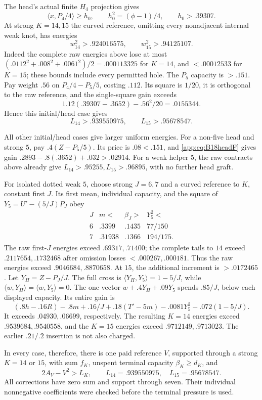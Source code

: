 \documentclass[11pt]{article}
\theoremstyle{definition}
\theoremstyle{remark}
\newcommand{\ip}[2]{\langle #1,#2\rangle}
\begin{document}
The head's actual finite \(H_4\) projection gives
\[
 \ip x{P_4/4}\geq h_0,\qquad
 h_0^2=(\phi-1)/4,\qquad h_0>.39307.
\]
At strong \(K=14,15\) the curved reference, omitting every
nonadjacent internal weak knot, has energies
\[
 w_{14}^2>.924016575,\qquad w_{15}^2>.94125107.
\]
Indeed the complete raw energies above lose at most
\((.0112^2+.008^2+.0061^2)/2=.000113325\)
for \(K=14\), and \(<.00012533\) for \(K=15\);
these bounds include every permitted hole.
The \(P_5\) capacity is \(>.151\).
Pay weight \(.56\) on \(P_4/4-P_5/5\), costing \(.112\).
Its square is \(1/20\), it is orthogonal to the raw reference,
and the single-square gain exceeds
\[
 1.12(.39307-.3652)-.56^2/20=.0155344.
\]
Hence this initial/head case gives
\[
 L_{14}>.939550975,\qquad L_{15}>.95678547.
\]

All other initial/head cases give larger uniform energies.
For a non-five head and strong \(5\), pay \(.4(Z-P_5/5)\).
Its price is \(.08<.151\), and
\eqref{app:eq:B18headF} gives gain
\(.2893-.8(.3652)+.032>.02914\).
For a weak helper \(5\), the raw contracts above already
give \(L_{14}>.95255,L_{15}>.96895\), with no further head graft.

For isolated dotted weak \(5\), choose strong \(J=6,7\) and
a curved reference to \(K\), constant first \(J\).
Its first mean, individual capacity, and the square of
\(Y_5=U'-(5/J)P_J\) obey
\[
\begin{array}{c|ccc}
J&m<&\beta_J>&Y_5^2<\\ \hline
6&.3399&.1435&77/150\\
7&.31938&.1366&194/175 .
\end{array}
\]
The raw first-\(J\) energies exceed \(.69317,.71400\);
the complete tails to \(14\) exceed \(.2117654,.1732468\)
after omission losses \(<.000267,.000181\).
Thus the raw energies exceed \(.9046684,.8870658\).
At \(15\), the additional increment is \(>.0172465\).
Let \(Y_H=Z-P_J/J\). The full cross is
\(\ip{Y_H}{Y_5}=1-5/J\), while
\(\ip w{Y_H}=\ip w{Y_5}=0\).
The one vector \(w+.4Y_H+.09Y_5\) spends \(.85/J\),
below each displayed capacity. Its entire gain is
\[
 (.8h-.16R)-.8m+.16/J
 +.18(T'-5m)-.0081Y_5^2-.072(1-5/J).
\]
It exceeds \(.04930,.06699\), respectively. The resulting
\(K=14\) energies exceed \(.9539684,.9540558\), and the
\(K=15\) energies exceed \(.9712149,.9713023\).
The earlier \(.21/.2\) insertion is not also charged.

In every case, therefore, there is one paid reference \(V\),
supported through a strong \(K=14\) or \(15\), with sum \(f_K\),
unspent terminal capacity \(\beta_K\geq d_K\), and
\begin{equation}\label{app:eq:B18uniformprefix}
 2A_V-V^2>L_K,\qquad
 L_{14}=.939550975,\quad L_{15}=.95678547 .
\end{equation}
All corrections have zero sum and support through seven.
Their individual nonnegative coefficients were checked before
the terminal pressure is used.
\end{document}
